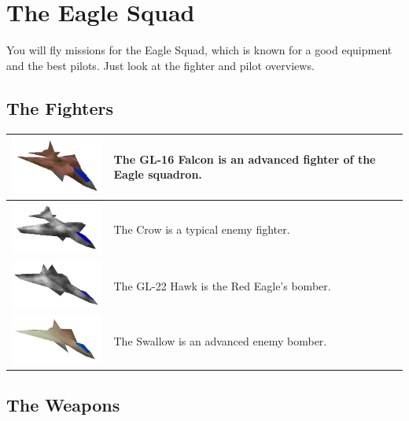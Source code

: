 \chapter{The Eagle Squad}
\label{chap:squad}

You will fly missions for the Eagle Squad, which
is known for a good equipment and the best pilots.
Just look at the fighter and pilot overviews.


\section{The Fighters}
\label{sec:fighters}

\begin{center}
\begin{tabular}{|c|l|}
\hline
\includegraphics[width=4cm]{falcon.jpg} &
The GL-16 Falcon is an advanced fighter of the Eagle squadron.\\
\hline
\includegraphics[width=4cm]{crow.jpg} &
The Crow is a typical enemy fighter.\\
\hline
\includegraphics[width=4cm]{hawk.jpg} &
The GL-22 Hawk is the Red Eagle's bomber.\\
\hline
\includegraphics[width=4cm]{swallow.jpg} &
The Swallow is an advanced enemy bomber.\\
\hline
\end{tabular}
\end{center}


\section{The Weapons}
\label{sec:weapons}

